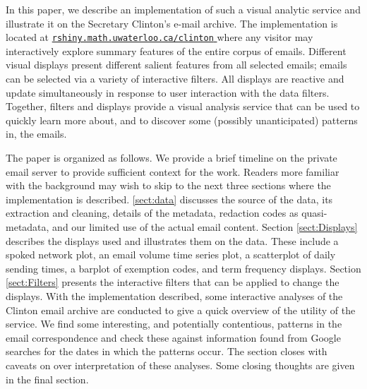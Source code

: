 \documentclass[journal]{vgtc}                %
\begin{document}
In this paper, we describe an implementation of such a visual analytic service and illustrate it on the Secretary Clinton's e-mail archive.  The implementation is located at
\href{https://rshiny.math.uwaterloo.ca/clinton}{\color{blue} \texttt{rshiny.math.uwaterloo.ca/clinton} }
where any visitor may interactively explore summary features  of the entire corpus of emails.   Different visual displays present different salient features from all selected emails; emails can be selected via a variety of interactive filters.   All displays are reactive and update simultaneously in response to user interaction with the data filters.  Together, filters and displays provide a visual analysis service that can be used to quickly learn more about, and to discover some (possibly unanticipated) patterns in, the emails. 

The paper is organized as follows.  We provide a brief timeline on the private email server to provide sufficient context for the work.  Readers more familiar with the background may wish to skip to the next three sections where the implementation is described.   \autoref{sect:data} discusses the source of the data, its extraction and cleaning,  details of the metadata,  redaction codes as quasi-metadata,  and our limited use of the actual email content. 
Section \autoref{sect:Displays} describes the displays used and illustrates them on the data. These include a spoked network plot, an email volume time series plot, a scatterplot of daily sending times, a barplot of exemption codes, and term frequency displays. Section \autoref{sect:Filters} presents the interactive filters that can be applied to change the displays.  With the implementation described, some interactive analyses of the Clinton email archive are conducted to give a quick overview of the utility of the service.  We find some interesting, and potentially contentious, patterns in the email correspondence and check these against information found from Google searches for the dates in which the patterns occur.  The section closes with caveats on over interpretation of these analyses.  Some closing thoughts are given in the final section.

%
\end{document}
